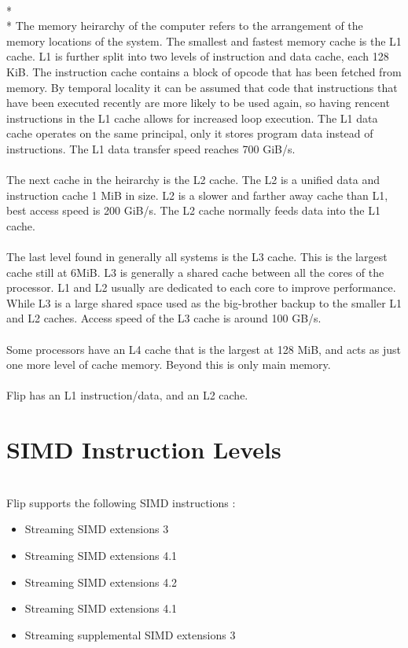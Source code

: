 \documentclass[letterpaper,10pt,titlepage]{article}
\begin{document}
    \\*
    \\*
    The memory heirarchy of the computer refers to the arrangement of the memory locations 
    of the system. The smallest and fastest memory cache is the L1 cache. L1 is further split 
    into two levels of instruction and data cache, each 128 KiB. The instruction cache contains a block 
    of opcode that has been fetched from memory. By temporal locality it can be assumed that code
    that instructions that have been executed recently are more likely to be used again, so having 
    rencent instructions in the L1 cache allows for increased loop execution. The L1 data cache operates
    on the same principal, only it stores program data instead of instructions. The L1 data transfer speed
    reaches 700 GiB/s. \\ 
    \\
    The next cache in the heirarchy is the L2 cache. The L2 is a unified data and instruction cache 1 MiB 
    in size. L2 is a slower and farther away cache than L1, best access speed is 200 GiB/s. The L2 cache 
    normally feeds data into the L1 cache.  \\
    \\
    The last level found in generally all systems is the L3 cache. This is the largest cache still at 6MiB. 
    L3 is generally a shared cache between all the cores of the processor. L1 and L2 usually are dedicated to each 
    core to improve performance. While L3 is a large shared space used as the big-brother backup to the smaller
    L1 and L2 caches. Access speed of the L3 cache is around 100 GB/s. \\
    \\
    Some processors have an L4 cache that is the largest at 128 MiB, and acts as just one more level of cache 
    memory. Beyond this is only main memory. \\
    \\
    Flip has an L1 instruction/data, and an L2 cache. \\
\pagebreak

\section{SIMD Instruction Levels}

    \\
    Flip supports the following SIMD instructions :
    \begin{itemize}
        \item Streaming SIMD extensions 3
        \item Streaming SIMD extensions 4.1
        \item Streaming SIMD extensions 4.2
        \item Streaming SIMD extensions 4.1
        \item Streaming supplemental SIMD extensions 3
    \end{itemize}
\pagebreak
\end{document}
